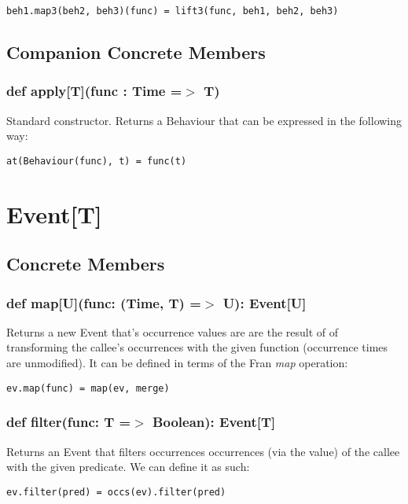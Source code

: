\begin{verbatim}
beh1.map3(beh2, beh3)(func) = lift3(func, beh1, beh2, beh3)
\end{verbatim}    

    \subsection*{Companion Concrete Members}
    \subsubsection*{def apply[T](func : Time =$>$ T)}
      Standard constructor. Returns a Behaviour
      that can be expressed in the following way:

\begin{verbatim}
at(Behaviour(func), t) = func(t)
\end{verbatim}
      
  \section*{Event[T]}
    \subsection*{Concrete Members}
    \subsubsection*{def map[U](func: (Time, T) =$>$ U): Event[U]}
      Returns a new Event that's occurrence values
      are are the result of of transforming the
      callee's occurrences with the given function (occurrence
      times are unmodified). It can be defined in terms of 
      the Fran \emph{map} operation:

\begin{verbatim}
ev.map(func) = map(ev, merge)
\end{verbatim}      
    
    \subsubsection*{def filter(func: T =$>$ Boolean): Event[T]}
      Returns an Event that filters occurrences
      occurrences (via the value) of the callee
      with the given predicate. We can define it as such:

\begin{verbatim}
ev.filter(pred) = occs(ev).filter(pred)
\end{verbatim}
      
